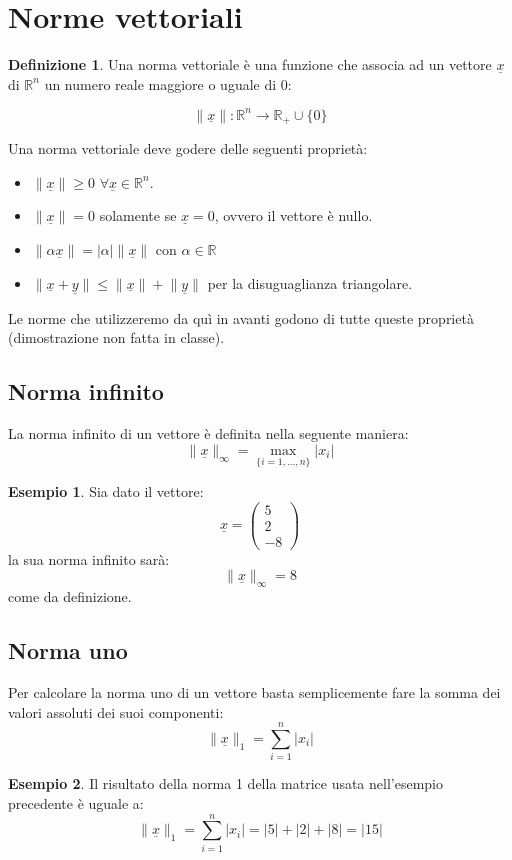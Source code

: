 \documentclass[12pt, a4paper]{book}
\theoremstyle{definition}
\newtheorem{exmp}{Esempio}[section]
\newtheorem{defn}{Definizione}[section]
\newcommand{\VarMtrx}[1]{\ensuremath{\underline{#1}}}
\begin{document}
\section{Norme vettoriali}
\begin{flushleft}
\begin{defn}
Una norma vettoriale è una funzione che associa ad un vettore \VarMtrx{x} di $\mathbb{R}^{n}$ un numero reale maggiore o uguale di 0: 

\[ \lVert \VarMtrx{x} \rVert:  \mathbb{R}^{n} \longrightarrow \mathbb{R}_{+} \cup \{0\} \]
\end{defn}
Una norma vettoriale deve godere delle seguenti proprietà: 
\begin{itemize}
	\item $\lVert \VarMtrx{x} \rVert \geq 0$ $\forall \VarMtrx{x} \in \mathbb{R}^{n}$.
	\item $\lVert \VarMtrx{x} \rVert = 0$ solamente se $\VarMtrx{x} = 0$, ovvero il vettore è nullo.
	\item $\lVert\alpha \VarMtrx{x}\rVert = |\alpha|\lVert\VarMtrx{x}\rVert$ con $\alpha \in \mathbb{R}$
	\item $\lVert \VarMtrx{x} + \VarMtrx{y}\rVert \leq \lVert \VarMtrx{x}\rVert + \lVert\VarMtrx{y}\rVert$ per la disuguaglianza triangolare.
\end{itemize}
Le norme che utilizzeremo da quì in avanti godono di tutte queste proprietà (dimostrazione non fatta in classe).  
\end{flushleft}

\subsection{Norma infinito}
\begin{flushleft}
La norma infinito di un vettore è definita nella seguente maniera: 
\[ \lVert\VarMtrx{x}\rVert_{\infty}  = \max_{\{i = 1,...,n\}} |x_{i}| \]

\begin{exmp}
Sia dato il vettore:
\[ \VarMtrx{x} = \begin{pmatrix} 5 \\ 2 \\ -8  \end{pmatrix} \]
la sua norma infinito sarà: 
\[ \lVert\VarMtrx{x}\rVert_{\infty}  = 8\]
come da definizione. 
\end{exmp}
\end{flushleft}

\subsection{Norma uno}
\begin{flushleft}
Per calcolare la norma uno di un vettore basta semplicemente fare la somma dei valori assoluti dei suoi componenti: 
\[ \lVert\VarMtrx{x}\rVert_{1}  =\sum_{i=1}^{n} |x_{i}| \]

\begin{exmp}
Il risultato della norma 1 della matrice usata nell'esempio precedente è uguale a: 
\[ \lVert\VarMtrx{x}\rVert_{1}  =\sum_{i=1}^{n} |x_{i}|  = |5| + |2| + |8| = |15| \]
\end{exmp}
\end{flushleft}
\end{document}
